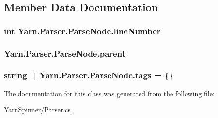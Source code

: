\subsection{Member Data Documentation}
\hypertarget{a00120_a18b493382de0fde5b4299c1bd2250075}{
\subsubsection[{line\-Number}]{\setlength{\rightskip}{0pt plus 5cm}int Yarn.\-Parser.\-Parse\-Node.\-line\-Number\hspace{0.3cm}{\ttfamily [package]}}}\label{a00120_a18b493382de0fde5b4299c1bd2250075}
\hypertarget{a00120_af313a82103fcc2ff5a177dbb06b92f7b}{
\subsubsection[{parent}]{ Yarn.\-Parser.\-Parse\-Node.\-parent\hspace{0.3cm}{\ttfamily [package]}}}\label{a00120_af313a82103fcc2ff5a177dbb06b92f7b}
\hypertarget{a00120_a58b3a15788fd2d4127d73619dc6d04ae}{
\subsubsection[{tags}]{\setlength{\rightskip}{0pt plus 5cm}string \mbox{[}$\,$\mbox{]} Yarn.\-Parser.\-Parse\-Node.\-tags = \{\}\hspace{0.3cm}{\ttfamily [package]}}}\label{a00120_a58b3a15788fd2d4127d73619dc6d04ae}


The documentation for this class was generated from the following file\-:\begin{DoxyCompactItemize}
\item 
Yarn\-Spinner/\hyperlink{a00266}{Parser.\-cs}\end{DoxyCompactItemize}
